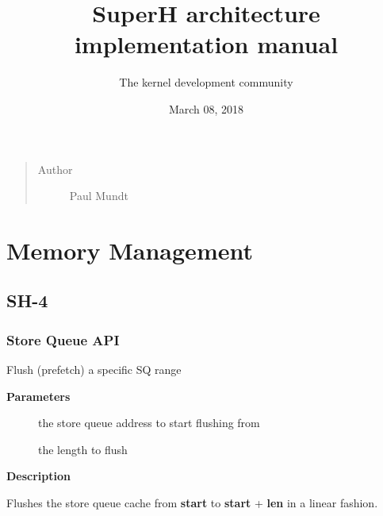 \documentclass[a4paper,8pt,english]{sphinxmanual}
\title{SuperH architecture implementation manual}
\date{March 08, 2018}
\author{The kernel development community}
\begin{document}
\maketitle
\tableofcontents
{}\label{sh/index::doc}

\begin{quote}\begin{description}
\item[{Author}] \leavevmode
Paul Mundt

\end{description}\end{quote}


\chapter{Memory Management}
\label{sh/index:memory-management}\label{sh/index:superh-interfaces-guide}

\section{SH-4}
\label{sh/index:sh-4}

\subsection{Store Queue API}
\label{sh/index:store-queue-api}

\begin{fulllineitems}
\label{sh/index:c.sq_flush_range}
Flush (prefetch) a specific SQ range

\end{fulllineitems}


\textbf{Parameters}
\begin{description}
\item[{}] \leavevmode
the store queue address to start flushing from

\item[{}] \leavevmode
the length to flush

\end{description}

\textbf{Description}

Flushes the store queue cache from \textbf{start} to \textbf{start} + \textbf{len} in a
linear fashion.
\end{document}
